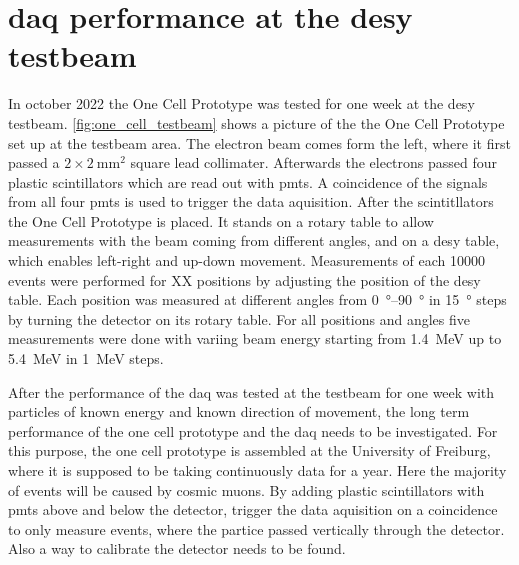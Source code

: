 \chapter{\ac{daq} performance at the \ac{desy} testbeam}
In october 2022 the One Cell Prototype was tested for one week at the \ac{desy} testbeam.
\autoref{fig:one_cell_testbeam} shows a picture of the the One Cell Prototype set up at the testbeam area.
The electron beam comes form the left, where it first passed a $2\times\SI{2}{\milli\meter\squared}$ square lead collimater.
Afterwards the electrons passed four plastic scintillators which are read out with \acp{pmt}.
A coincidence of the signals from all four \acp{pmt} is used to trigger the data aquisition.
After the scintitllators the One Cell Prototype is placed.
It stands on a rotary table to allow measurements with the beam coming from different angles, and on a \ac{desy} table, which enables left-right and up-down movement.
Measurements of each \num{10000} events were performed for XX positions by adjusting the position of the \ac{desy} table.
Each position was measured at different angles from \SIrange{0}{90}{\degree} in \SI{15}{\degree} steps by turning the detector on its rotary table.
For all positions and angles five measurements were done with variing beam energy starting from \SI{1.4}{\mega\electronvolt} up to \SI{5.4}{\mega\electronvolt} in \SI{1}{\mega\electronvolt} steps.






After the performance of the \ac{daq} was tested at the testbeam for one week with particles of known energy and known direction of movement, the long term performance of the one cell prototype and the \ac{daq} needs to be investigated.
For this purpose, the one cell prototype is assembled at the University of Freiburg, where it is supposed to be taking continuously data for a year.
Here the majority of events will be caused by cosmic muons.
By adding plastic scintillators with \acp{pmt} above and below the detector, trigger the data aquisition on a coincidence to only measure events, where the partice passed vertically through the detector.
Also a way to calibrate the detector needs to be found.
